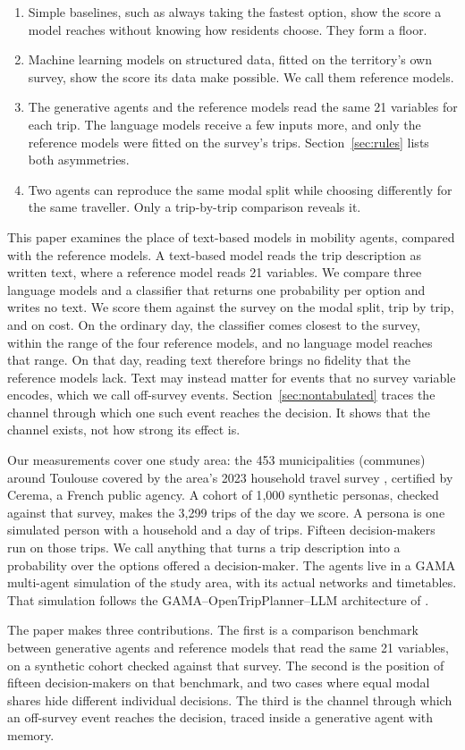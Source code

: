 \begin{enumerate}
  \item Simple baselines, such as always taking the fastest option, show the score a model
  reaches without knowing how residents choose. They form a floor.
  \item Machine learning models on structured data, fitted on the territory's own survey, show
  the score its data make possible. We call them reference models.
  \item The generative agents and the reference models read the same 21 variables for each
  trip. The language models receive a few inputs more, and only the reference models were
  fitted on the survey's trips. Section~\ref{sec:rules} lists both asymmetries.
  \item Two agents can reproduce the same modal split while choosing differently for the same
  traveller. Only a trip-by-trip comparison reveals it.
\end{enumerate}

\label{sec:contributions}

This paper examines the place of text-based models in mobility agents, compared with the
reference models. A text-based model reads the trip description as written text, where a
reference model reads 21 variables. We compare three language models and a classifier that
returns one probability per option and writes no text. We score them against the survey on
the modal split, trip by trip, and on cost. On the ordinary day, the classifier comes
closest to the survey, within the range of the four reference models, and no language model
reaches that range. On that day, reading text therefore brings no fidelity that the
reference models lack. Text may instead matter for events that no survey variable encodes,
which we call off-survey events. Section~\ref{sec:nontabulated} traces the channel through
which one such event reaches the decision. It shows that the channel exists, not how strong
its effect is.

Our measurements cover one study area: the 453 municipalities (communes) around Toulouse
covered by the area's 2023 household travel survey \citep{tisseo2023emc2}, certified by
Cerema, a French public agency. A cohort of 1{,}000 synthetic personas, checked against that
survey, makes the 3{,}299 trips of the day we score. A persona is one simulated person with a
household and a day of trips. Fifteen decision-makers run on those trips. We call anything
that turns a trip description into a probability over the options offered a decision-maker.
The agents live in a GAMA multi-agent simulation of the study area, with its actual networks
and timetables. That simulation follows the GAMA--OpenTripPlanner--LLM architecture of
\citet{vu2025modeling}.

The paper makes three contributions. The first is a comparison benchmark between
generative agents and reference models that read the same 21 variables, on a synthetic cohort
checked against that survey. The second is the position of fifteen decision-makers on that
benchmark, and two cases where equal modal shares hide different individual decisions. The
third is the channel through which an off-survey event reaches the decision, traced inside a
generative agent with memory.

